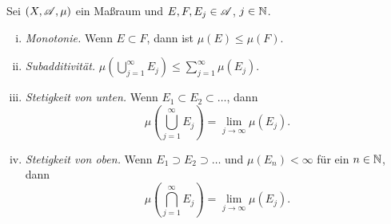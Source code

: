 \begin{thm}
 Sei $(X, \mathscr{A}, \mu)$ ein Maßraum und $E, F, E_j \in \mathscr{A}$, $j \in \mathbb{N}$. 
 \begin{enumerate}[(i)]
  \item \emph{Monotonie.} Wenn $E \subset F$, dann ist $\mu(E) \le \mu(F)$.
  \item \emph{Subadditivität.} $\mu \left( \bigcup_{j=1}^\infty E_j \right) \le \sum_{j=1}^\infty \mu(E_j)$.
  \item \emph{Stetigkeit von unten.} Wenn $E_1 \subset E_2 \subset \ldots$, dann
   \[ \mu \left( \bigcup_{j=1}^\infty E_j \right) = \lim_{j \to \infty} \mu( E_j ).  \]
  \item \emph{Stetigkeit von oben.} Wenn $E_1 \supset E_2 \supset \ldots$ und $\mu(E_n) < \infty$ für ein $n \in \mathbb{N}$, dann
   \[ \mu \left( \bigcap_{j=1}^\infty E_j \right) = \lim_{j \to \infty} \mu( E_j ).  \]
 \end{enumerate}
\end{thm}


